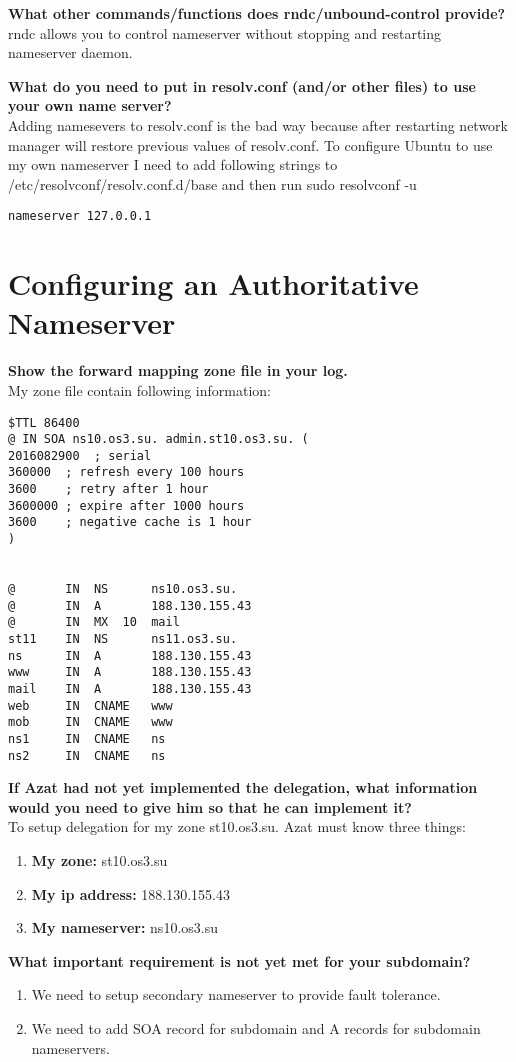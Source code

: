 \documentclass[a4paper,11pt]{article}
\theoremstyle{mytheor}
\begin{document}
\textbf{What other commands/functions does rndc/unbound-control provide?}
rndc allows you to control nameserver without stopping and restarting nameserver daemon.

\textbf{What do you need to put in resolv.conf (and/or other files) to use your own name server?}\\
Adding namesevers to resolv.conf is the bad way because after restarting network manager will restore previous values of resolv.conf. To configure Ubuntu to use my own nameserver I need to add following strings to /etc/resolvconf/resolv.conf.d/base and then run sudo resolvconf -u

\begin{lstlisting}
nameserver 127.0.0.1
\end{lstlisting}

\section{Configuring an Authoritative Nameserver}

\textbf{Show the forward mapping zone file in your log.}\\
My zone file contain following information:

\begin{lstlisting}
$TTL 86400
@ IN SOA ns10.os3.su. admin.st10.os3.su. (
2016082900  ; serial
360000  ; refresh every 100 hours
3600    ; retry after 1 hour
3600000 ; expire after 1000 hours
3600    ; negative cache is 1 hour
)


@       IN  NS      ns10.os3.su.
@       IN  A       188.130.155.43
@       IN  MX  10  mail
st11    IN  NS      ns11.os3.su.
ns      IN  A       188.130.155.43
www     IN  A       188.130.155.43
mail    IN  A       188.130.155.43
web     IN  CNAME   www
mob     IN  CNAME   www
ns1     IN  CNAME   ns
ns2     IN  CNAME   ns
\end{lstlisting}

\textbf{If Azat had not yet implemented the delegation, what information would you need
to give him so that he can implement it?}\\
To setup delegation for my zone st10.os3.su. Azat must know three things:
\begin{enumerate}
    \item \textbf{My zone:} st10.os3.su
    \item \textbf{My ip address:} 188.130.155.43
    \item \textbf{My nameserver:} ns10.os3.su
\end{enumerate}

\textbf{What important requirement is not yet met for your subdomain?}\\
\begin{enumerate}
    \item We need to setup secondary nameserver to provide fault tolerance.
    \item We need to add SOA record for subdomain and A records for subdomain nameservers.
\end{enumerate}
\end{document}
